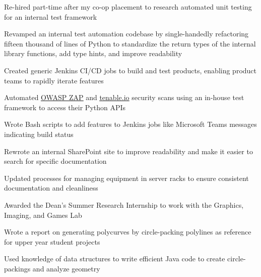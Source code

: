 \begin{bullets}
    \item Re-hired part-time after my co-op placement to research automated unit testing for an internal test framework
    \item Revamped an internal test automation codebase by single-handedly refactoring fifteen thousand of lines of Python to standardize the return types of the internal library functions, add type hints, and improve readability
    \item Created generic Jenkins CI/CD jobs to build and test products, enabling product teams to rapidly iterate features
    \item Automated \href{https://www.zaproxy.org/}{\underline{OWASP ZAP}} and \href{https://www.tenable.com/products/tenable-io}{\underline{tenable.io}} security scans using an in-house test framework to access their Python APIs
    \item Wrote Bash scripts to add features to Jenkins jobs like Microsoft Teams messages indicating build status
    \item Rewrote an internal SharePoint site to improve readability and make it easier to search for specific documentation
    \item Updated processes for managing equipment in server racks to ensure consistent documentation and cleanliness
\end{bullets}

\hbox{}

\begin{bullets}
    \item Awarded the Dean's Summer Research Internship to work with the Graphics, Imaging, and Games Lab
    \item Wrote a report on generating polycurves by circle-packing polylines as reference for upper year student projects
    \item Used knowledge of data structures to write efficient Java code to create circle-packings and analyze geometry
\end{bullets}

